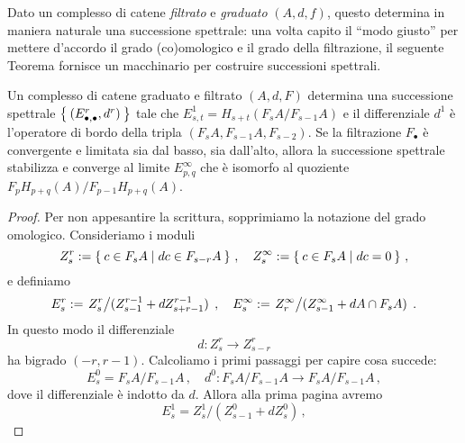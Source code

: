 


Dato un complesso di catene \emph{filtrato} e \emph{graduato} $(A,d,f)$,
questo determina in maniera naturale una successione spettrale:
una volta capito il ``modo giusto'' per mettere d'accordo il grado
(co)omologico e il grado della filtrazione, il seguente Teorema
fornisce un macchinario per costruire successioni spettrali.

\begin{thm}\label{SS-machine}
	Un complesso di catene graduato e filtrato $(A,d,F)$ determina una successione spettrale
	$\Set{(E_{\bullet,\bullet}^{r},d^{r})}$ tale che
	$E_{s,t}^{1} = H_{s+t}(F_{s}A/F_{s-1}A)$ e il differenziale $d^{1}$ è
	l'operatore di bordo della tripla $(F_{s}A,F_{s-1}A,F_{s-2})$.
	Se la filtrazione $F_{\bullet}$ è convergente e limitata sia dal basso, sia dall'alto,
	allora la successione spettrale stabilizza e converge al limite $E^{\infty}_{p,q}$
	che è isomorfo al quoziente $F_{p}H_{p+q}(A)/F_{p-1}H_{p+q}(A)$.
	\begin{proof}
		Per non appesantire la scrittura, 
		sopprimiamo la notazione del grado omologico.
		Consideriamo i moduli
		\begin{equation*}
			Z_{s}^{r} := \Set{c \in F_{s}A | dc \in F_{s-r}A}\,,
			\quad Z_{s}^{\infty} := \Set{c \in F_{s}A | dc = 0}\,,
		\end{equation*}
		e definiamo
		\begin{equation*}
			E^{r}_{s} := \left. Z_{s}^{r} \middle/ (Z_{s-1}^{r-1} + dZ^{r-1}_{s+r-1}) \right. \,,
			\quad E^{\infty}_{s} := \left. Z^{\infty}_{r} \middle/ (Z_{s-1}^{\infty} + dA \cap F_{s}A) \right. \,.
		\end{equation*}
		In questo modo il differenziale
		\begin{equation*}
			d: Z^{r}_{s} \longrightarrow Z_{s-r}^{r}
		\end{equation*}
		ha bigrado $(-r,r-1)$. 
		Calcoliamo i primi passaggi per capire cosa succede:
		\begin{equation*}
			E_{s}^{0} = F_{s}A/F_{s-1}A\,, \quad
			d^{0}: F_{s}A/F_{s-1}A \longrightarrow F_{s}A/F_{s-1}A\,,
		\end{equation*}
		dove il differenziale è indotto da $d$. Allora alla prima pagina avremo
		\begin{equation*}
			E_{s}^{1} = Z_{s}^{1}/(Z_{s-1}^{0} + dZ_{s}^{0})\,,

\end{equation*}
\end{proof}
\end{thm}
